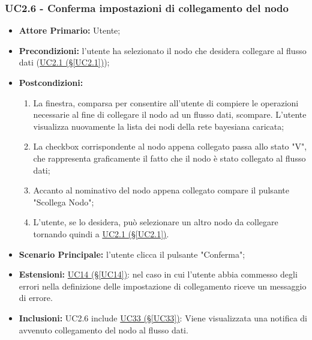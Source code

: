 \subsubsection{UC2.6 - Conferma impostazioni di collegamento del nodo}\label{UC2.6}
\begin{itemize}
\item \textbf{Attore Primario:} Utente;
\item \textbf{Precondizioni:} l'utente ha selezionato il nodo che desidera collegare al flusso dati 					(\hyperref[UC2.1]{UC2.1 (§\ref*{UC2.1})});
\item \textbf{Postcondizioni:}
	\begin{enumerate}
	\item La finestra, comparsa per consentire all'utente di compiere le operazioni necessarie al fine di collegare il 		nodo ad un flusso dati, scompare. L'utente visualizza nuovamente la lista dei nodi della rete bayesiana caricata;
	\item La checkbox corrispondente al nodo appena collegato passa allo stato "V", che rappresenta graficamente il fatto che il nodo è stato collegato al flusso dati;
	\item Accanto al nominativo del nodo appena collegato compare il pulsante "Scollega Nodo";
	\item L'utente, se lo desidera, può selezionare un altro nodo da collegare tornando quindi a \hyperref[UC2.1]{UC2.1 (§\ref*{UC2.1})}.
	\end{enumerate}
\item \textbf{Scenario Principale:} l'utente clicca il pulsante "Conferma";
\item \textbf{Estensioni:} \hyperref[UC14]{UC14 (§\ref*{UC14})}: nel caso in cui l'utente abbia commesso degli errori nella definizione delle impostazione di collegamento riceve un messaggio di errore.
\item \textbf{Inclusioni:} UC2.6 include \hyperref[UC33]{UC33 (§\ref*{UC33})}: Viene visualizzata una notifica di avvenuto collegamento del nodo al flusso dati. 
\end{itemize}

\pagebreak

